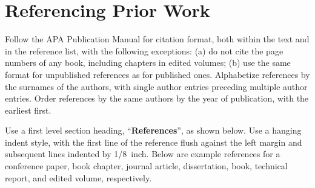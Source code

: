 \documentclass{ccn}  %
\begin{document}
\section{Referencing Prior Work}

Follow the APA Publication Manual for citation format, both within the text and in the
reference list, with the following exceptions: (a) do not cite the page numbers of any
book, including chapters in edited volumes; (b) use the same format for unpublished
references as for published ones.
Alphabetize references by the surnames of the authors, with single author entries
preceding multiple author entries.
Order references by the same authors by the year of publication, with the earliest
first.

Use a first level section heading, ``{\bf References}'', as shown below.
Use a hanging indent style, with the first line of the reference flush against the left
margin and subsequent lines indented by 1/8~inch.
Below are example references for a conference paper, book chapter, journal article,
dissertation, book, technical report, and edited volume, respectively.

\nocite{ChalnickBillman1988a}
\nocite{Feigenbaum1963a}
\nocite{Hill1983a}
\nocite{OhlssonLangley1985a}
\nocite{Matlock2001}
\nocite{NewellSimon1972a}
\nocite{ShragerLangley1990a}

\printbibliography
\end{document}
